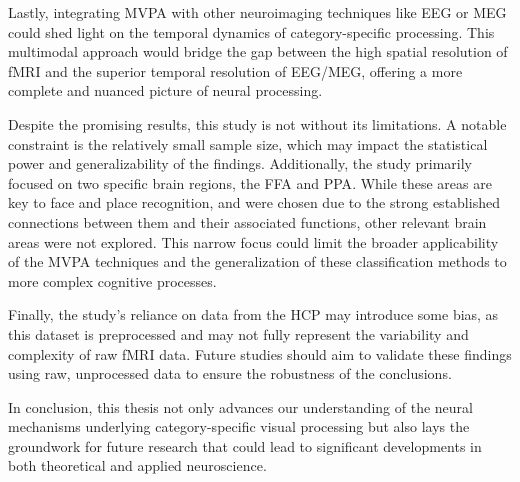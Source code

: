 Lastly, integrating \gls{MVPA} with other neuroimaging techniques like \gls{EEG} or \gls{MEG} could shed light on the temporal dynamics of category-specific processing. This multimodal approach would bridge the gap between the high spatial resolution of \gls{fMRI} and the superior temporal resolution of \gls{EEG}/\gls{MEG}, offering a more complete and nuanced picture of neural processing.

Despite the promising results, this study is not without its limitations. A notable constraint is the relatively small sample size, which may impact the statistical power and generalizability of the findings. Additionally, the study primarily focused on two specific brain regions, the \gls{FFA} and \gls{PPA}. While these areas are key to face and place recognition, and were chosen due to the strong established connections between them and their associated functions, other relevant brain areas were not explored. This narrow focus could limit the broader applicability of the \gls{MVPA} techniques and the generalization of these classification methods to more complex cognitive processes.

Finally, the study's reliance on data from the \gls{HCP} may introduce some bias, as this dataset is preprocessed and may not fully represent the variability and complexity of raw \gls{fMRI} data. Future studies should aim to validate these findings using raw, unprocessed data to ensure the robustness of the conclusions.

In conclusion, this thesis not only advances our understanding of the neural mechanisms underlying category-specific visual processing but also lays the groundwork for future research that could lead to significant developments in both theoretical and applied neuroscience.